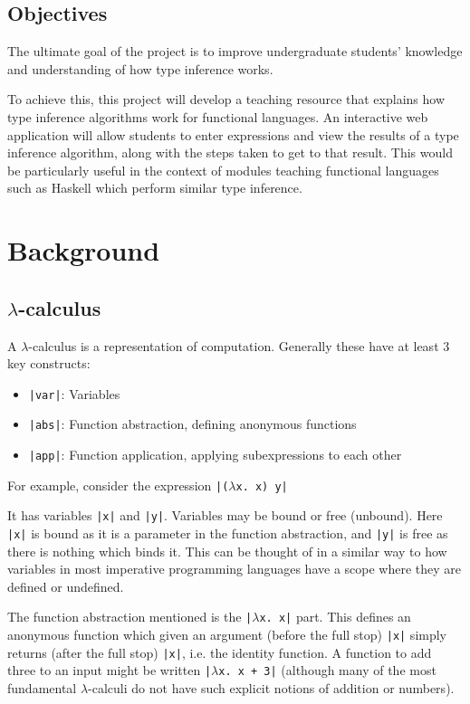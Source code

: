 \documentclass[a4paper,fleqn,12pt]{article}
\begin{document}
\subsection{Objectives}\label{id:h.o72kh3tf0r5l}
The ultimate goal of the project is to improve undergraduate students’ knowledge and understanding of how type inference works.

To achieve this, this project will develop a teaching resource that explains how type inference algorithms work for functional languages. An interactive web application will allow students to enter expressions and view the results of a type inference algorithm, along with the steps taken to get to that result. This would be particularly useful in the context of modules teaching functional languages such as Haskell which perform similar type inference.
\section{Background}\label{id:h.ebjyqi73zdyo}
\subsection{$\lambda$-calculus}\label{id:h.odw4vku9eizz}
A $\lambda$-calculus is a representation of computation. Generally these have at least 3 key constructs:
\begin{itemize}
  \item \texttt{|var|}: Variables
  \item \texttt{|abs|}: Function abstraction, defining anonymous functions
  \item \texttt{|app|}: Function application, applying subexpressions to each other
\end{itemize}

For example, consider the expression \texttt{|($\lambda$x. x) y|}

It has variables \texttt{|x|} and \texttt{|y|}. Variables may be bound or free (unbound). Here \texttt{|x|} is bound as it is a parameter in the function abstraction, and \texttt{|y|} is free as there is nothing which binds it. This can be thought of in a similar way to how variables in most imperative programming languages have a scope where they are defined or undefined.

The function abstraction mentioned is the \texttt{|$\lambda$x. x|} part. This defines an anonymous function which given an argument (before the full stop) \texttt{|x|} simply returns (after the full stop) \texttt{|x|}, i.e. the identity function. A function to add three to an input might be written \texttt{|$\lambda$x. x + 3|} (although many of the most fundamental $\lambda$-calculi do not have such explicit notions of addition or numbers).
\end{document}
